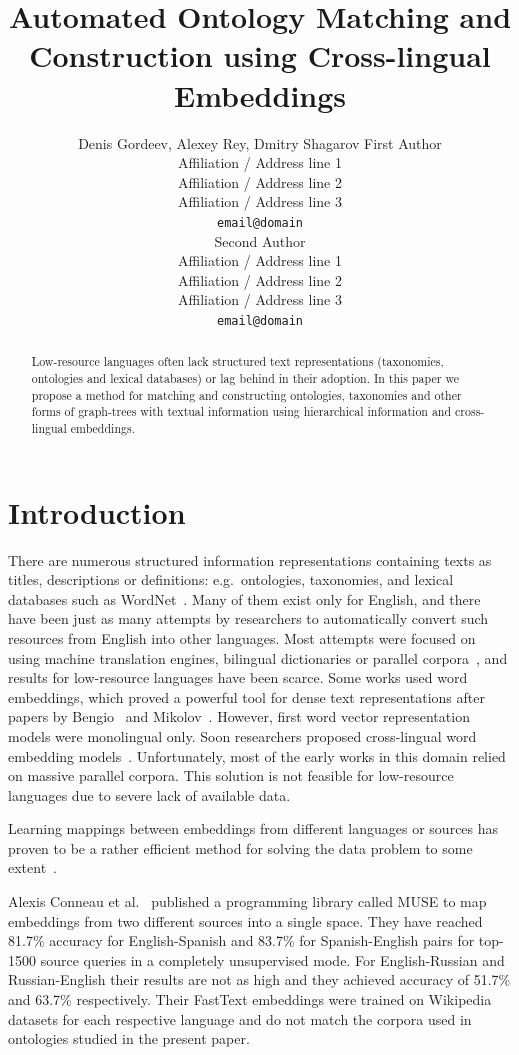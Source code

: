 \documentclass[11pt,a4paper]{article}
\title{Automated Ontology Matching and Construction using Cross-lingual Embeddings}
\author{Denis Gordeev, Alexey Rey, Dmitry Shagarov
	First Author \\
  Affiliation / Address line 1 \\
  Affiliation / Address line 2 \\
  Affiliation / Address line 3 \\
  \texttt{email@domain} \\\And
  Second Author \\
  Affiliation / Address line 1 \\
  Affiliation / Address line 2 \\
  Affiliation / Address line 3 \\
  \texttt{email@domain} \\}
\date{}
\begin{document}
\maketitle
\begin{abstract}
Low-resource languages often lack structured text representations (taxonomies, ontologies and lexical databases) or lag behind in their adoption. In this paper we propose a method for matching and constructing ontologies, taxonomies and other forms of graph-trees with textual information using hierarchical information and cross-lingual embeddings.
\end{abstract}

\section{Introduction}

There are numerous structured information representations containing texts as titles, descriptions or definitions: e.g.\ ontologies, taxonomies, and lexical databases such as WordNet~\cite{wordnet}. Many of them exist only for English, and there have been just as many attempts by researchers to automatically convert such resources from English into other languages. Most attempts were focused on using machine translation engines, bilingual dictionaries or parallel corpora~\cite{Khodak2017,NEALE18.1030}, and results for low-resource languages have been scarce. Some works used word embeddings, which proved a powerful tool for dense text representations after papers by Bengio~\cite{bengio} and Mikolov~\cite{mikolov-representations-2013}. However, first word vector representation models were monolingual only. Soon researchers proposed cross-lingual word embedding models~\cite{mikolov-parallel,lazaridou-parallel}. Unfortunately, most of the early works in this domain relied on massive parallel corpora. This solution is not feasible for low-resource languages due to severe lack of available data.

Learning mappings between embeddings from different languages or sources has proven to be a rather efficient method for solving the data problem to some extent~\cite{ruder-survey}.

Alexis Conneau et al.~\cite{muse} published a programming library called MUSE to map embeddings from two different sources into a single space. They have reached 81.7\% accuracy for English-Spanish and 83.7\% for Spanish-English pairs for top-1500 source queries in a completely unsupervised mode. For English-Russian and Russian-English their results are not as high and they achieved accuracy of 51.7\% and 63.7\% respectively. Their FastText embeddings were trained on Wikipedia datasets for each respective language and do not match the corpora used in ontologies studied in the present paper.
\end{document}
